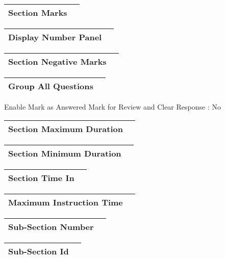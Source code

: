 \documentclass{article}
\begin{document}
\begin{longtable}{|c|c|}
\hline
\textbf{Section Marks} & \textbf{} \\ \hline
\end{longtable}

\begin{longtable}{|c|c|}
\hline
\textbf{Display Number Panel} & \textbf{} \\ \hline
\end{longtable}

\begin{longtable}{|c|c|}
\hline
\textbf{Section Negative Marks} & \textbf{} \\ \hline
\end{longtable}

\begin{longtable}{|c|c|}
\hline
\textbf{Group All Questions} & \textbf{} \\ \hline
\end{longtable}

Enable Mark as Answered Mark for Review and 
Clear Response :
No\\

\begin{longtable}{|c|c|}
\hline
\textbf{Section Maximum Duration} & \textbf{} \\ \hline
\end{longtable}

\begin{longtable}{|c|c|}
\hline
\textbf{Section Minimum Duration} & \textbf{} \\ \hline
\end{longtable}

\begin{longtable}{|c|c|}
\hline
\textbf{Section Time In} & \textbf{} \\ \hline
\end{longtable}

\begin{longtable}{|c|c|}
\hline
\textbf{Maximum Instruction Time} & \textbf{} \\ \hline
\end{longtable}

\begin{longtable}{|c|c|}
\hline
\textbf{Sub-Section Number} & \textbf{} \\ \hline
\end{longtable}

\begin{longtable}{|c|c|}
\hline
\textbf{Sub-Section Id} & \textbf{} \\ \hline
\end{longtable}
\end{document}
